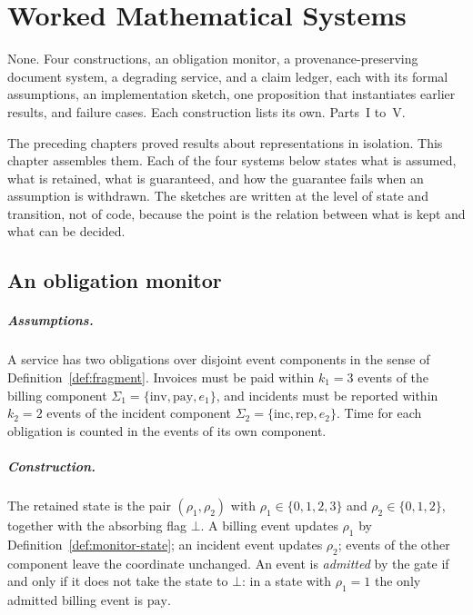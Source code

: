 \chapter{Worked Mathematical Systems}\label{ch:worked}
{None.}
{Four constructions, an obligation monitor, a provenance-preserving document system, a degrading service, and a claim ledger, each with its formal assumptions, an implementation sketch, one proposition that instantiates earlier results, and failure cases.}
{Each construction lists its own.}
{Parts~I to~V.}

The preceding chapters proved results about representations in isolation. This chapter assembles them. Each of the four systems below states what is assumed, what is retained, what is guaranteed, and how the guarantee fails when an assumption is withdrawn. The sketches are written at the level of state and transition, not of code, because the point is the relation between what is kept and what can be decided.

\section{An obligation monitor}

\paragraph{Assumptions.} A service has two obligations over disjoint event components in the sense of Definition~\ref{def:fragment}. Invoices must be paid within $k_1=3$ events of the billing component $\Sigma_1=\{\mathrm{inv},\mathrm{pay},e_1\}$, and incidents must be reported within $k_2=2$ events of the incident component $\Sigma_2=\{\mathrm{inc},\mathrm{rep},e_2\}$. Time for each obligation is counted in the events of its own component.

\paragraph{Construction.} The retained state is the pair $(\rho_1,\rho_2)$ with $\rho_1\in\{0,1,2,3\}$ and $\rho_2\in\{0,1,2\}$, together with the absorbing flag $\bot$. A billing event updates $\rho_1$ by Definition~\ref{def:monitor-state}; an incident event updates $\rho_2$; events of the other component leave the coordinate unchanged. An event is \emph{admitted} by the gate if and only if it does not take the state to $\bot$: in a state with $\rho_1=1$ the only admitted billing event is $\mathrm{pay}$.

